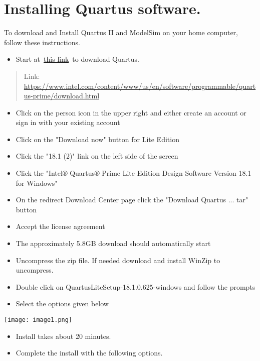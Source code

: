 \chapter{Installing Quartus software.}
\graphicspath{ {./Lab00HowTo/howTo00 Install Quartus/Fig} }



To download and Install Quartus II and ModelSim on your home computer,
follow these instructions.~~

\begin{itemize}
\item
  Start
  at~\href{https://www.intel.com/content/www/us/en/software/programmable/quartus-prime/download.html}{this
  link}~to download Quartus.~
\end{itemize}

\begin{quote}
Link:
\url{https://www.intel.com/content/www/us/en/software/programmable/quartus-prime/download.html}
\end{quote}

\begin{itemize}
\item
  Click on the person icon in the upper right and either create an
  account or sign in with your existing account
\item
  Click on the "Download now" button for Lite Edition
\item
  Click the "18.1 (2)" link on the left side of the screen
\item
  Click the "Intel® Quartus® Prime Lite Edition Design Software Version
  18.1 for Windows"
\item
  On the redirect Download Center page click the "Download Quartus ...
  tar" button
\item
  Accept the license agreement
\item
  The approximately 5.8GB download should automatically start
\item
  Uncompress the zip file. If needed download and install WinZip to
  uncompress.
\item
  Double click on QuartusLiteSetup-18.1.0.625-windows and follow the
  prompts
\item
  Select the options given below
\end{itemize}

\texttt{[image: image1.png]}

\begin{itemize}
\item
  Install takes about 20 minutes.
\item
  Complete the install with the following options.
\end{itemize}

